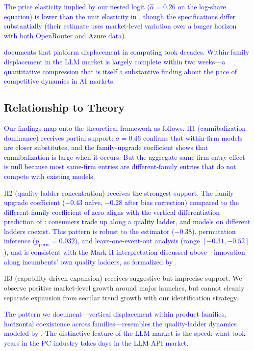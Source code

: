 \documentclass[11pt, a4paper]{article}
\begin{document}
\textcolor{blue}{The price elasticity implied by our nested logit ($\hat{\alpha} = 0.26$ on the log-share equation) is lower than the unit elasticity in \citet{demirer2025emerging}, though the specifications differ substantially (their estimate uses market-level variation over a longer horizon with both OpenRouter and Azure data).}

\textcolor{blue}{\citet{bresnahan1999technological} documents that platform displacement in computing took decades. Within-family displacement in the LLM market is largely complete within two weeks---a quantitative compression that is itself a substantive finding about the pace of competitive dynamics in AI markets.}

\subsection{Relationship to Theory}

\textcolor{blue}{Our findings map onto the theoretical framework as follows. H1 (cannibalization dominance) receives partial support: $\sigma = 0.46$ confirms that within-firm models are closer substitutes, and the family-upgrade coefficient shows that cannibalization is large when it occurs. But the aggregate same-firm entry effect is null because most same-firm entries are different-family entries that do not compete with existing models.}

\textcolor{blue}{H2 (quality-ladder concentration) receives the strongest support. The family-upgrade coefficient ($-0.43$ na\"ive, $-0.28$ after \citealt{roth2022pretest} bias correction) compared to the different-family coefficient of zero aligns with the vertical differentiation prediction of \citet{shaked1982relaxing}: consumers trade up along a quality ladder, and models on different ladders coexist. This pattern is robust to the \citet{sunAbraham2021} estimator ($-0.38$), permutation inference ($p_{\text{perm}} = 0.032$), and leave-one-event-out analysis (range $[-0.31, -0.52]$), and is consistent with the Mark II interpretation discussed above---innovation along incumbents' own quality ladders, as formalized by \citet{aghion1992model}.}

H3 (capability-driven expansion) receives suggestive but imprecise support. We observe positive market-level growth around major launches, but cannot cleanly separate expansion from secular trend growth with our identification strategy.

\textcolor{blue}{The pattern we document---vertical displacement within product families, horizontal coexistence across families---resembles the quality-ladder dynamics modeled by \citet{baron2020vertical}. The distinctive feature of the LLM market is the speed: what took years in the PC industry \citep{bresnahan2011schumpeterian} takes days in the LLM API market.}
\end{document}
